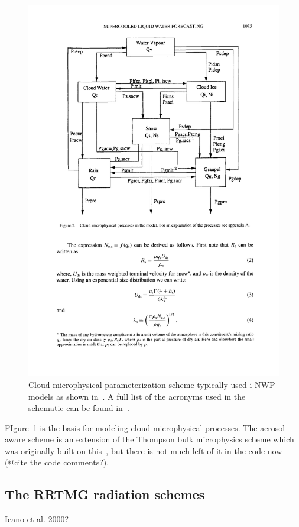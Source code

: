 \begin{figure}
\centering
\includegraphics[scale=0.8]{model_methods/microphysics.pdf}
\caption{Cloud microphysical parameterization scheme typically used i NWP models as shown in~\cite{Reisner1998}. A full list of the acronyms used in the schematic can be found in~\cite{Reisner1998}.}
\label{fig:microphysics}
\end{figure}

FIgure~\ref{fig:microphysics} is the basis for modeling cloud microphysical processes. The aerosol-aware scheme is an extension of the Thompson bulk microphysics scheme which was originally built on this~\citep{Thompson2004}, but there is not much left of it in the code now (@cite the code comments?).

\subsection{The RRTMG radiation schemes}
Icano et al. 2000?

